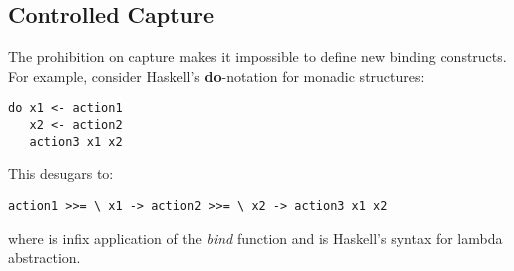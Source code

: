 




\subsection{Controlled Capture}\label{sec:controlled-binding}

The prohibition on capture makes it impossible to define new binding constructs. For example, consider Haskell's \textbf{do}-notation for monadic structures:
\begin{lstlisting}[numbers=none]
do x1 <- action1
   x2 <- action2
   action3 x1 x2
\end{lstlisting}
This desugars to:
\begin{lstlisting}[numbers=none]
action1 >>= \ x1 -> action2 >>= \ x2 -> action3 x1 x2
\end{lstlisting}
where \li{>>=} is infix application of the  \emph{bind} function and  is Haskell's syntax for lambda abstraction.

